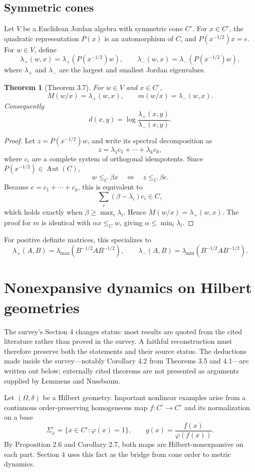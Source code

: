 \documentclass[11pt]{article}
\newtheorem{theorem}{Theorem}
\newcommand{\Aut}{\operatorname{Aut}}
\begin{document}
\subsection{Symmetric cones}
Let \(V\) be a Euclidean Jordan algebra with symmetric cone \(C^\circ\).  For \(x\in C^\circ\), the quadratic representation \(P(x)\) is an automorphism of \(C\), and \(P(x^{-1/2})x=e\).  For \(w\in V\), define
\[
  \lambda_+(w,x)=\lambda_+(P(x^{-1/2})w),
  \qquad
  \lambda_-(w,x)=\lambda_-(P(x^{-1/2})w),
\]
where \(\lambda_+\) and \(\lambda_-\) are the largest and smallest Jordan eigenvalues.

\begin{theorem}[Theorem 3.7]
For \(w\in V\) and \(x\in C^\circ\),
\[
  M(w/x)=\lambda_+(w,x),
  \qquad
  m(w/x)=\lambda_-(w,x).
\]
Consequently
\[
  d(x,y)=\log\frac{\lambda_+(x,y)}{\lambda_-(x,y)}.
\]
\end{theorem}

\begin{proof}
Let \(z=P(x^{-1/2})w\), and write its spectral decomposition as
\[
  z=\lambda_1c_1+
\cdots+\lambda_kc_k,
\]
where \(c_i\) are a complete system of orthogonal idempotents.  Since \(P(x^{-1/2})\in\Aut(C)\),
\[
  w\le_C \beta x
  \quad\Longleftrightarrow\quad
  z\le_C \beta e.
\]
Because \(e=c_1+
\cdots+c_k\), this is equivalent to
\[
  \sum_i(\beta-
\lambda_i)c_i\in C,
\]
which holds exactly when \(\beta\ge\max_i\lambda_i\).  Hence \(M(w/x)=\lambda_+(w,x)\).  The proof for \(m\) is identical with \(\alpha x\le_C w\), giving \(\alpha\le\min_i\lambda_i\).
\end{proof}

For positive definite matrices, this specializes to
\[
  \lambda_+(A,B)=\lambda_{\max}(B^{-1/2}AB^{-1/2}),
  \qquad
  \lambda_-(A,B)=\lambda_{\min}(B^{-1/2}AB^{-1/2}).
\]

\section{Nonexpansive dynamics on Hilbert geometries}
The survey's Section 4 changes status: most results are quoted from the cited literature rather than
proved in the survey.  A faithful reconstruction must therefore preserve both the statements and their
source status.  The deductions made inside the survey---notably Corollary 4.2 from Theorems 3.5 and
4.1---are written out below; externally cited theorems are not presented as arguments supplied by
Lemmens and Nussbaum.

Let \((\Omega,\delta)\) be a Hilbert geometry.  Important nonlinear examples arise from a
continuous order-preserving homogeneous map \(f:C^\circ\to C^\circ\) and its normalization on a
base
\[
 \Sigma_\varphi^\circ=\{x\in C^\circ:\varphi(x)=1\},
 \qquad
 g(x)=\frac{f(x)}{\varphi(f(x))}.
\]
By Proposition 2.6 and Corollary 2.7, both maps are Hilbert-nonexpansive on each part.  Section 4
uses this fact as the bridge from cone order to metric dynamics.
\end{document}
